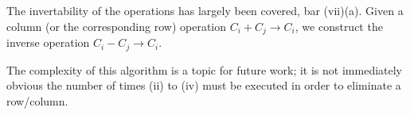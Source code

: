 The invertability of the operations has largely been covered, bar (vii)(a). Given a column (or the corresponding row) operation $C_i + C_j \to C_i$, we construct the inverse operation $C_i - C_j \to C_i$.

The complexity of this algorithm is a topic for future work; it is not immediately obvious the number of times (ii) to (iv) must be executed in order to eliminate a row/column.